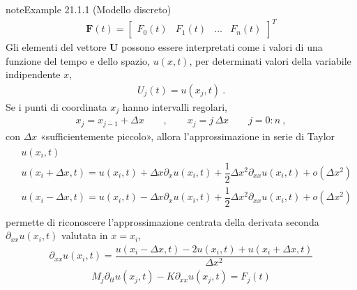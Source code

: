\documentclass[letterpaper,10pt,italian]{jupyterBook}
\begin{document}
\begin{sphinxadmonition}{note}{Example 21.1.1 (Modello discreto)}
\begin{equation*}
\end{equation*}\begin{equation*}
\begin{split}\mathbf{F}(t) = \begin{bmatrix} F_0(t) & F_1(t) & \dots & F_n(t) \end{bmatrix}^T\end{split}
\end{equation*}
\sphinxAtStartPar
{} Gli elementi del vettore \(\mathbf{U}\) possono essere interpretati come i valori di una funzione del tempo e dello spazio, \(u(x,t)\), per determinati valori della variabile indipendente \(x\),
\begin{equation*}
\begin{split}U_j(t) = u(x_j, t) \ .\end{split}
\end{equation*}
\sphinxAtStartPar
Se i punti di coordinata \(x_j\) hanno intervalli regolari,
\begin{equation*}
\begin{split}x_j = x_{j-1} + \Delta x \qquad , \qquad x_j = j \, \Delta x \qquad j = 0:n \ ,\end{split}
\end{equation*}
\sphinxAtStartPar
con \(\Delta x\) «sufficientemente piccolo», allora l’approssimazione in serie di Taylor
\begin{equation*}
\begin{split}\begin{aligned}
  & u(x_i,t) \\
  & u(x_i+\Delta x, t) = u(x_i,t) + \Delta x \partial_x u(x_i,t) + \dfrac{1}{2} \Delta x^2 \partial_{xx} u(x_i,t) + o(\Delta x^2) \\
  & u(x_i-\Delta x, t) = u(x_i,t) - \Delta x \partial_x u(x_i,t) + \dfrac{1}{2} \Delta x^2 \partial_{xx} u(x_i,t) + o(\Delta x^2) \\
\end{aligned}\end{split}
\end{equation*}
\sphinxAtStartPar
permette di riconoscere l’approssimazione centrata della derivata seconda \(\partial_{xx} u(x_i, t)\) valutata in \(x = x_i\),
\begin{equation*}
\begin{split}\partial_{xx} u(x_i,t) = \dfrac{u(x_i-\Delta x,t) - 2 u(x_i,t) + u(x_i+\Delta x,t)}{\Delta x^2}\end{split}
\end{equation*}\begin{equation*}
\begin{split}M_j \partial_{tt} u(x_j,t) - K \partial_{xx} u(x_j,t) = F_j(t) \end{split}
\end{equation*}\end{sphinxadmonition}
\end{document}
